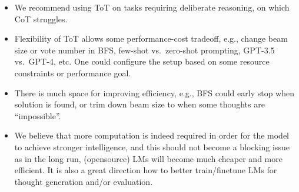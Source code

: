 \documentclass[
]{article}
\providecommand{\tightlist}{%
  \setlength{\itemsep}{0pt}\setlength{\parskip}{0pt}}
\begin{document}
\begin{itemize}
\tightlist
\item
  We recommend using ToT on tasks requiring deliberate reasoning, on
  which CoT struggles.\\
\item
  Flexibility of ToT allows some performance-cost tradeoff, e.g., change
  beam size or vote number in BFS, few-shot vs.~zero-shot prompting,
  GPT-3.5 vs.~GPT-4, etc. One could configure the setup based on some
  resource constraints or performance goal.\\
\item
  There is much space for improving efficiency, e.g., BFS could early
  stop when solution is found, or trim down beam size to when some
  thoughts are ``impossible''.\\
\item
  We believe that more computation is indeed required in order for the
  model to achieve stronger intelligence, and this should not become a
  blocking issue as in the long run, (opensource) LMs will become much
  cheaper and more efficient. It is also a great direction how to better
  train/finetune LMs for thought generation and/or evaluation.
\end{itemize}
\end{document}
